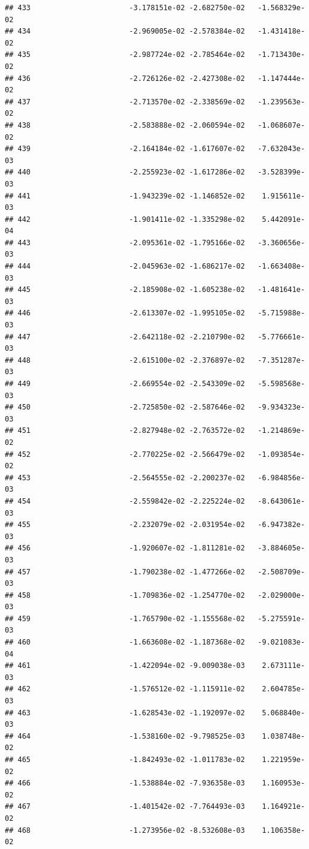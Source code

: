 \documentclass[
]{article}
\begin{document}
\begin{verbatim}
## 433                       -3.178151e-02 -2.682750e-02   -1.568329e-02
## 434                       -2.969005e-02 -2.578384e-02   -1.431418e-02
## 435                       -2.987724e-02 -2.785464e-02   -1.713430e-02
## 436                       -2.726126e-02 -2.427308e-02   -1.147444e-02
## 437                       -2.713570e-02 -2.338569e-02   -1.239563e-02
## 438                       -2.583888e-02 -2.060594e-02   -1.068607e-02
## 439                       -2.164184e-02 -1.617607e-02   -7.632043e-03
## 440                       -2.255923e-02 -1.617286e-02   -3.528399e-03
## 441                       -1.943239e-02 -1.146852e-02    1.915611e-03
## 442                       -1.901411e-02 -1.335298e-02    5.442091e-04
## 443                       -2.095361e-02 -1.795166e-02   -3.360656e-03
## 444                       -2.045963e-02 -1.686217e-02   -1.663408e-03
## 445                       -2.185908e-02 -1.605238e-02   -1.481641e-03
## 446                       -2.613307e-02 -1.995105e-02   -5.715988e-03
## 447                       -2.642118e-02 -2.210790e-02   -5.776661e-03
## 448                       -2.615100e-02 -2.376897e-02   -7.351287e-03
## 449                       -2.669554e-02 -2.543309e-02   -5.598568e-03
## 450                       -2.725850e-02 -2.587646e-02   -9.934323e-03
## 451                       -2.827948e-02 -2.763572e-02   -1.214869e-02
## 452                       -2.770225e-02 -2.566479e-02   -1.093854e-02
## 453                       -2.564555e-02 -2.200237e-02   -6.984856e-03
## 454                       -2.559842e-02 -2.225224e-02   -8.643061e-03
## 455                       -2.232079e-02 -2.031954e-02   -6.947382e-03
## 456                       -1.920607e-02 -1.811281e-02   -3.884605e-03
## 457                       -1.790238e-02 -1.477266e-02   -2.508709e-03
## 458                       -1.709836e-02 -1.254770e-02   -2.029000e-03
## 459                       -1.765790e-02 -1.155568e-02   -5.275591e-03
## 460                       -1.663608e-02 -1.187368e-02   -9.021083e-04
## 461                       -1.422094e-02 -9.009038e-03    2.673111e-03
## 462                       -1.576512e-02 -1.115911e-02    2.604785e-03
## 463                       -1.628543e-02 -1.192097e-02    5.068840e-03
## 464                       -1.538160e-02 -9.798525e-03    1.038748e-02
## 465                       -1.842493e-02 -1.011783e-02    1.221959e-02
## 466                       -1.538884e-02 -7.936358e-03    1.160953e-02
## 467                       -1.401542e-02 -7.764493e-03    1.164921e-02
## 468                       -1.273956e-02 -8.532608e-03    1.106358e-02

\end{verbatim}
\end{document}
